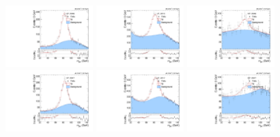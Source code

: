 \begin{figure}[htbp]
  \centering
  \includegraphics[width=0.3\textwidth]{fig/analysis/PostFit__MJJ__allC_allL_HP_2016.pdf}
  \includegraphics[width=0.3\textwidth]{fig/analysis/PostFit__MJJ__allC_allL_LP_2016.pdf}
  \includegraphics[width=0.3\textwidth]{fig/analysis/PostFit__MJJ__allC_allL_NP_2016.pdf}\\
  \includegraphics[width=0.3\textwidth]{fig/analysis/PostFit__MJJ__allC_allL_HP_2017.pdf}
  \includegraphics[width=0.3\textwidth]{fig/analysis/PostFit__MJJ__allC_allL_LP_2017.pdf}
  \includegraphics[width=0.3\textwidth]{fig/analysis/PostFit__MJJ__allC_allL_NP_2017.pdf}\\

\end{figure}
